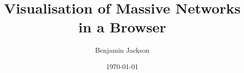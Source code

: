 \documentclass{l4proj}
\begin{document}
\title{Visualisation of Massive Networks in a Browser}
\author{Benjamin Jackson}
\date{\today}
\maketitle




\educationalconsent

\tableofcontents

\pagebreak
{}














\end{document}
